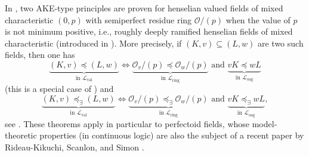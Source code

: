 \documentclass[a4paper]{amsart}
\theoremstyle{mystyle2}
\theoremstyle{mystyle}
\renewcommand{\O}{\mathcal{O}}
\numberwithin{equation}{section}
\begin{document}
    
    In \cite{jahnke-kartas2023beyond}, two AKE-type principles are proven for henselian
    valued fields of mixed characteristic $(0,p)$ with semiperfect residue ring $\O/(p)$
    when the value of $p$ is not minimum positive, i.e., 
    roughly deeply ramified henselian
    fields of mixed characteristic (introduced in \cite{KuhlBla}). More precisely, if $(K,v) \subseteq (L,w)$
    are two such fields, then one has
    $$
     \underbrace{(K,v) \preceq (L,w)}_{\text{in }\mathcal{L}_\mathrm{val}} \Longleftrightarrow \underbrace{\mathcal{O}_v/(p) \preceq \mathcal{O}_w/(p)}_{\text{in }\mathcal{L}_{\mathrm{ring}}}\textrm{ and } \underbrace{vK \preceq wL}_{\text{in }\mathcal{L}_{\mathrm{oag}}}
    $$
    (this is a special case of \cite[Theorem 5.1.4]{jahnke-kartas2023beyond}) and 
     $$
     \underbrace{(K,v) \preceq_\exists (L,w)}_{\text{in }\mathcal{L}_\mathrm{val}} \Longleftrightarrow \underbrace{\mathcal{O}_v/(p) \preceq_\exists \mathcal{O}_w/(p)}_{\text{in }\mathcal{L}_{\mathrm{ring}}}\textrm{ and } \underbrace{vK \preceq_\exists wL}_{\text{in }\mathcal{L}_{\mathrm{oag}}},$$
    see \cite[Theorem 5.1.10]{jahnke-kartas2023beyond}. These theorems apply in particular to perfectoid fields, whose model-theoretic properties (in continuous
    logic) are also the subject of a recent paper by Rideau-Kikuchi, Scanlon, and Simon \cite{RSS}.
    
\end{document}
